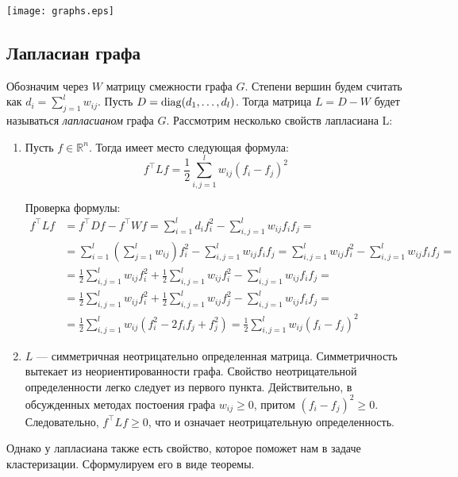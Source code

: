 \documentclass[12pt,fleqn]{article}
\begin{document}
\texttt{[image: graphs.eps]}

\subsection{Лапласиан графа}

Обозначим через $W$ матрицу смежности графа $G$. Степени вершин будем считать как $d_i=\sum_{j=1}^{l}w_{ij}$. Пусть $D=\mathop{\mathrm{diag}}(d_1, \dots, d_l)$. Тогда матрица $L=D-W$ будет называться {\it лапласианом} графа $G$. Рассмотрим несколько свойств лапласиана L:

\begin{enumerate}
   \item Пусть $f \in \mathbb R^n$. Тогда имеет место следующая формула:
\[
f^\intercal L f = \frac12 \sum_{i,j=1}^{l}w_{ij}(f_i - f_j)^2
\]

Проверка формулы:
\begin{align*}
f^\intercal L f &= f^\intercal D f - f^\intercal W f = \sum_{i=1}^l d_i f_i^2 - \sum_{i, j = 1}^l w_{ij} f_i f_j = \\
&= \sum_{i=1}^l \left( \sum_{j=1}^l w_{ij} \right) f_i^2 - \sum_{i, j = 1}^l w_{ij} f_i f_j = \sum_{i, j = 1}^l w_{ij} f_i^2 - \sum_{i, j = 1}^l w_{ij} f_i f_j = \\
&= \frac{1}{2} \sum_{i, j = 1}^l w_{ij} f_i^2 + \frac{1}{2} \sum_{i, j = 1}^l w_{ij} f_i^2 - \sum_{i, j = 1}^l w_{ij} f_i f_j = \\
&= \frac{1}{2} \sum_{i, j = 1}^l w_{ij} f_i^2 + \frac{1}{2} \sum_{i, j = 1}^l w_{ij} f_j^2 - \sum_{i, j = 1}^l w_{ij} f_i f_j = \\
&= \frac{1}{2} \sum_{i, j = 1}^l w_{ij}\left(f_i^2 - 2 f_i f_j + f_j^2\right) = \frac{1}{2} \sum_{i, j = 1}^l w_{ij} {\left(f_i - f_j\right)}^2
\end{align*}

   \item $L$ --- симметричная неотрицательно определенная матрица. Симметричность вытекает из неориентированности графа. Свойство неотрицательной определенности легко следует из первого пункта. Действительно, в обсужденных методах постоения графа $w_{ij} \ge 0$, притом $(f_i - f_j)^2 \ge 0$. Следовательно, $f^\intercal L f \ge 0$, что и означает неотрицательную определенность.
   
\end{enumerate}

Однако у лапласиана также есть свойство, которое поможет нам в задаче кластеризации. Сформулируем его в виде теоремы.
\end{document}
